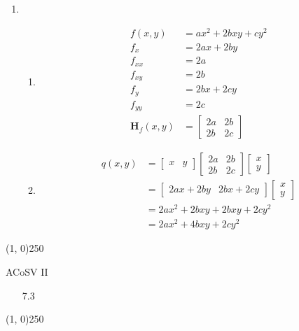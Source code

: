 \documentclass[11pt,letterpaper]{article}
\begin{document}
\begin{enumerate}
\item
  \begin{enumerate}
  \item
    \begin{align*}
      f(x,y) &= ax^2+2bxy+cy^2 \\
      f_x &= 2ax+2by \\
      f_{xx} &= 2a \\
      f_{xy} &= 2b \\
      f_y &= 2bx+2cy \\
      f_{yy} &= 2c \\
      \mathbf{H}_f(x,y) &= \begin{bmatrix}
                             2a & 2b \\
                             2b & 2c
                           \end{bmatrix}
    \end{align*}

  \item
    \begin{align*}
      q(x,y) &= \begin{bmatrix} x & y \end{bmatrix}
                \begin{bmatrix} 2a & 2b \\ 2b & 2c \end{bmatrix}
                \begin{bmatrix} x \\ y \end{bmatrix} \\
          &= \begin{bmatrix} 2ax+2by & 2bx+2cy \end{bmatrix}
             \begin{bmatrix} x \\ y \end{bmatrix} \\
          &= 2ax^2+2bxy+2bxy+2cy^2 \\
          &= 2ax^2+4bxy+2cy^2
    \end{align*}
  \end{enumerate}
\end{enumerate}

\begin{center}
\line(1, 0){250}
\end{center}
\noindent
ACoSV II

\begin{enumerate}
\item[7.3]

\end{enumerate}

\begin{center}
\line(1, 0){250}
\end{center}
\end{document}
